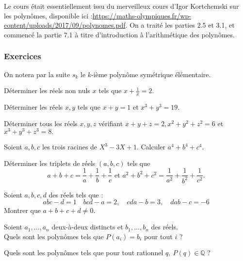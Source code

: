 Le cours était essentiellement issu du merveilleux cours d'Igor Kortchemski sur les polynômes, disponible ici :\url{https://maths-olympiques.fr/wp-content/uploads/2017/09/polynomes.pdf}. On a traité les parties 2.5 et 3.1, et commencé la partie 7.1 à titre d'introduction à l'arithmétique des polynômes.


\subsubsection{Exercices}


On notera par la suite $s_k$ le $k$-ième polynôme symétrique élémentaire.


\begin{exo}
Déterminer les réels non nuls $x$ tels que $x+\frac1x=2.$
\end{exo}


\begin{exo}
Déterminer les réels $x,y$ tels que $x+y=1$ et $x^3+y^3=19$.
\end{exo}


\begin{exo}
Déterminer tous les réels $x,y,z$ vérifiant $x+y+z=2,x^2+y^2+z^2=6$ et $x^3+y^3+z^3=8.$
\end{exo}


\begin{exo}
Soient $a,b,c$ les trois racines de $X^3-3X+1$. Calculer $a^4+b^4+c^4$.
\end{exo}


\begin{exo}
Déterminer les triplets de réels $(a,b,c)$ tels que $$a+b+c=\frac1a+\frac1b+\frac1c\text{ et }a^2+b^2+c^2= \frac1{a^2}+\frac1{b^2}+\frac1{c^2}.$$
\end{exo}


\begin{exo}
Soient $a,b,c,d$ des réels tels que :
$$abc-d=1\quad bcd-a=2,\quad cda-b=3,\quad dab-c=-6$$Montrer que $a+b+c+d\ne 0$.
\end{exo}


\begin{exo}
Soient $a_1,\dots,a_n$ deux-à-deux distincts et $b_1,\ldots,b_n$ des réels.\\
Quels sont les polynômes tels que $P(a_i)=b_i$ pour tout $i$ ?
\end{exo}


\begin{exo}
Quels sont les polynômes tels que pour tout rationnel $q,\:P(q)\in\mathbb Q$ ?
\end{exo}


